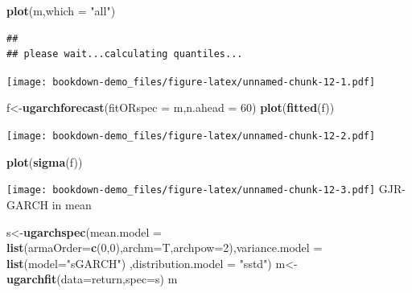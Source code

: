 \documentclass[
  12pt,
  a4paper,
  openany]{book}
\newenvironment{Shaded}{\begin{snugshade}}{\end{snugshade}}
\newcommand{\DataTypeTok}[1]{\textcolor[rgb]{0.13,0.29,0.53}{#1}}
\newcommand{\DecValTok}[1]{\textcolor[rgb]{0.00,0.00,0.81}{#1}}
\newcommand{\KeywordTok}[1]{\textcolor[rgb]{0.13,0.29,0.53}{\textbf{#1}}}
\newcommand{\NormalTok}[1]{#1}
\newcommand{\StringTok}[1]{\textcolor[rgb]{0.31,0.60,0.02}{#1}}
\begin{document}
\begin{Shaded}
\begin{Highlighting}[]
\KeywordTok{plot}\NormalTok{(m,}\DataTypeTok{which =} \StringTok{"all"}\NormalTok{)}
\end{Highlighting}
\end{Shaded}

\begin{verbatim}
## 
## please wait...calculating quantiles...
\end{verbatim}

\texttt{[image: bookdown-demo\_files/figure-latex/unnamed-chunk-12-1.pdf]}

\begin{Shaded}
\begin{Highlighting}[]
\NormalTok{f\textless{}{-}}\KeywordTok{ugarchforecast}\NormalTok{(}\DataTypeTok{fitORspec =}\NormalTok{ m,}\DataTypeTok{n.ahead =} \DecValTok{60}\NormalTok{)}
\KeywordTok{plot}\NormalTok{(}\KeywordTok{fitted}\NormalTok{(f))}
\end{Highlighting}
\end{Shaded}

\texttt{[image: bookdown-demo\_files/figure-latex/unnamed-chunk-12-2.pdf]}

\begin{Shaded}
\begin{Highlighting}[]
\KeywordTok{plot}\NormalTok{(}\KeywordTok{sigma}\NormalTok{(f))}
\end{Highlighting}
\end{Shaded}

\texttt{[image: bookdown-demo\_files/figure-latex/unnamed-chunk-12-3.pdf]}
GJR-GARCH in mean

\begin{Shaded}
\begin{Highlighting}[]
\NormalTok{s\textless{}{-}}\KeywordTok{ugarchspec}\NormalTok{(}\DataTypeTok{mean.model =} \KeywordTok{list}\NormalTok{(}\DataTypeTok{armaOrder=}\KeywordTok{c}\NormalTok{(}\DecValTok{0}\NormalTok{,}\DecValTok{0}\NormalTok{),}\DataTypeTok{archm=}\NormalTok{T,}\DataTypeTok{archpow=}\DecValTok{2}\NormalTok{),}\DataTypeTok{variance.model =} \KeywordTok{list}\NormalTok{(}\DataTypeTok{model=}\StringTok{"sGARCH"}\NormalTok{)}
\NormalTok{              ,}\DataTypeTok{distribution.model =} \StringTok{"sstd"}\NormalTok{)}
\NormalTok{m\textless{}{-}}\KeywordTok{ugarchfit}\NormalTok{(}\DataTypeTok{data=}\NormalTok{return,}\DataTypeTok{spec=}\NormalTok{s)}
\NormalTok{m}
\end{Highlighting}
\end{Shaded}
\end{document}
